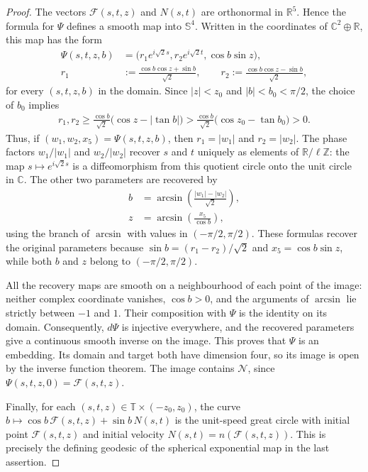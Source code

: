 \documentclass[a4paper,11pt,oneside,reqno]{amsart}
\numberwithin{equation}{section}
\theoremstyle{definition}
\begin{document}
\begin{proof}
    The vectors $\mathcal F(s,t,z)$ and $N(s,t)$ are
    orthonormal in $\mathbb R^5$. Hence the formula
    for $\Psi$ defines a smooth map into $\mathbb S^4$.
    Written in the coordinates of $\mathbb C^2\oplus\mathbb R$,
    this map has the form
    \begin{align*}
        \Psi(s,t,z,b)
        &=\bigl(r_1e^{i\sqrt2s},r_2e^{i\sqrt2t},
        \cos b\sin z\bigr),\\
        r_1&:=\frac{\cos b\cos z+\sin b}{\sqrt2},
        \qquad
        r_2:=\frac{\cos b\cos z-\sin b}{\sqrt2},
    \end{align*}
    for every $(s,t,z,b)$ in the domain.
    Since $|z|<z_0$ and $|b|<b_0<\pi/2$, the choice of
    $b_0$ implies
    \begin{align*}
        r_1,r_2
        \geq\frac{\cos b}{\sqrt2}
        \bigl(\cos z-|\tan b|\bigr)
        >\frac{\cos b}{\sqrt2}
        \bigl(\cos z_0-\tan b_0\bigr)>0.
    \end{align*}
    Thus, if $(w_1,w_2,x_5)=\Psi(s,t,z,b)$, then
    $r_1=|w_1|$ and $r_2=|w_2|$. The phase factors
    $w_1/|w_1|$ and $w_2/|w_2|$ recover $s$ and $t$
    uniquely as elements of $\mathbb R/\ell\mathbb Z$:
    the map $s\mapsto e^{i\sqrt2s}$ is a diffeomorphism
    from this quotient circle onto the unit circle in
    $\mathbb C$. The other two parameters are recovered by
    \begin{align*}
        b&=\arcsin\left(\frac{|w_1|-|w_2|}{\sqrt2}\right),\\
        z&=\arcsin\left(\frac{x_5}{\cos b}\right),
    \end{align*}
    using the branch of $\arcsin$ with values in
    $(-\pi/2,\pi/2)$.
    These formulas recover the original parameters because
    $\sin b=(r_1-r_2)/\sqrt2$ and $x_5=\cos b\sin z$,
    while both $b$ and $z$ belong to $(-\pi/2,\pi/2)$.

    All the recovery maps are smooth on a neighbourhood
    of each point of the image: neither complex coordinate
    vanishes, $\cos b>0$, and the arguments of $\arcsin$
    lie strictly between $-1$ and $1$.
    Their composition with $\Psi$ is the identity on its
    domain. Consequently, $d\Psi$ is injective everywhere,
    and the recovered parameters give a continuous smooth
    inverse on the image. This proves that $\Psi$ is an
    embedding. Its domain and target both have dimension
    four, so its image is open by the inverse function
    theorem. The image contains $\mathcal N$, since
    $\Psi(s,t,z,0)=\mathcal F(s,t,z)$.

    Finally, for each $(s,t,z)\in\mathbb T\times(-z_0,z_0)$,
    the curve
    $b\mapsto\cos b\,\mathcal F(s,t,z)+\sin b\,N(s,t)$
    is the unit-speed great circle with initial point
    $\mathcal F(s,t,z)$ and initial velocity
    $N(s,t)=n(\mathcal F(s,t,z))$. This is precisely the
    defining geodesic of the spherical exponential map
    in the last assertion.
\end{proof}
%
\end{document}
